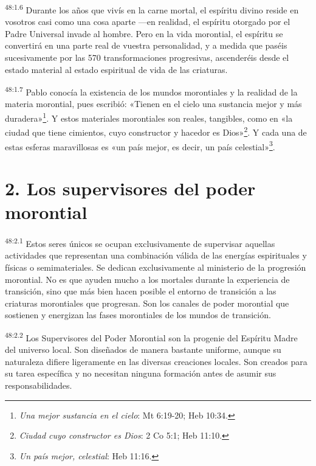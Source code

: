 \par
\textsuperscript{48:1.6} Durante los años que vivís en la carne mortal, el espíritu divino reside en vosotros casi como una cosa aparte ---en realidad, el espíritu otorgado por el Padre Universal invade al hombre. Pero en la vida morontial, el espíritu se convertirá en una parte real de vuestra personalidad, y a medida que paséis sucesivamente por las 570 transformaciones progresivas, ascenderéis desde el estado material al estado espiritual de vida de las criaturas.

\par
\textsuperscript{48:1.7} Pablo conocía la existencia de los mundos morontiales y la realidad de la materia morontial, pues escribió: «Tienen en el cielo una sustancia mejor y más duradera»\footnote{\textit{Una mejor sustancia en el cielo}: Mt 6:19-20; Heb 10:34.}. Y estos materiales morontiales son reales, tangibles, como en «la ciudad que tiene cimientos, cuyo constructor y hacedor es Dios»\footnote{\textit{Ciudad cuyo constructor es Dios}: 2 Co 5:1; Heb 11:10.}. Y cada una de estas esferas maravillosas es «un país mejor, es decir, un país celestial»\footnote{\textit{Un país mejor, celestial}: Heb 11:16.}.

\section*{2. Los supervisores del poder morontial}
\par
\textsuperscript{48:2.1} Estos seres únicos se ocupan exclusivamente de supervisar aquellas actividades que representan una combinación válida de las energías espirituales y físicas o semimateriales. Se dedican exclusivamente al ministerio de la progresión morontial. No es que ayuden mucho a los mortales durante la experiencia de transición, sino que más bien hacen posible el entorno de transición a las criaturas morontiales que progresan. Son los canales de poder morontial que sostienen y energizan las fases morontiales de los mundos de transición.

\par
\textsuperscript{48:2.2} Los Supervisores del Poder Morontial son la progenie del Espíritu Madre del universo local. Son diseñados de manera bastante uniforme, aunque su naturaleza difiere ligeramente en las diversas creaciones locales. Son creados para su tarea específica y no necesitan ninguna formación antes de asumir sus responsabilidades.

